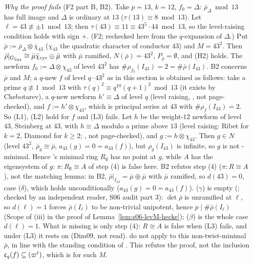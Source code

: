 \begin{remark}\label{rem:s06-levM-open}
\emph{Why the proof fails} (F2 part B, B2). Take $p=13$, $k=12$, $f_0=\Delta$: $\bar\rho_\Delta\bmod13$ has full image and $\Delta$ is ordinary at
$13$ ($\tau(13)\equiv8\bmod13$). Let $\ell=43\not\equiv\pm1\bmod13$; then $\tau(43)\equiv11\equiv43^5\cdot44\bmod13$, so the level-raising
condition holds with sign $+$. \stcomp{} (F2; rechecked here from the $q$-expansion of $\Delta$.) Put $\bar\rho:=\bar\rho_\Delta\otimes\bar\chi_{43}$
($\chi_{43}$ the quadratic character of conductor $43$) and $M=43^2$. Then $\bar\rho|_{G_{\mathbb{Q}_{43}}}\cong\bar\mu\bar\chi_{\rm cyc}\oplus\bar\mu$ with $\bar\mu$
ramified, $N(\bar\rho)=43^2$, $P_{\bar\rho}=\emptyset$, and (H2) holds. The newform $f_0:=\Delta\otimes\chi_{43}$ of level $43^2$ has $\#\rho_{f_0}(I_{43})=2=
\#\bar\rho(I_{43})$. B2 concerns $\bar\rho$ and $M$; a $q$-new $f$ of level $q\cdot43^2$ as in this section is obtained as follows: take a
prime $q\not\equiv1\bmod13$ with $\tau(q)^2\equiv q^{10}(q+1)^2\bmod13$ (it exists by Chebotarev), a $q$-new newform $h'\equiv\Delta$ of level
$q$ (level raising, \stcited, not page-checked), and $f:=h'\otimes\chi_{43}$, which is principal series at $43$ with $\#\rho_f(I_{43})=2$. So
(L1), (L2) hold for $f$ and (L3) fails. Let $h$ be the weight-$12$ newform of level $43$, Steinberg at $43$, with
$h\equiv\Delta$ modulo a prime above $13$ (level raising: Ribet for $k=2$, Diamond for $k\ge2$; \stcited, not page-checked), and
$g:=h\otimes\chi_{43}$. Then $g\in\mathcal N$ (level $43^2$, $\bar\rho_g\cong\bar\rho$, $a_{43}(g)=0=a_{43}(f)$), but $\rho_g(I_{43})$ is infinite, so $g$ is
not \cite{KO}-minimal. Hence \cite{KO}'s minimal ring $R_\emptyset$ has no point at $g$, while $A$ has the eigensystem of $g$: $\pi:R_\emptyset\cong A$
of step (4) is false here. B2 refutes step (4) ($\pi:R\cong A$), not the matching lemma: in B2,
$\bar\rho|_{I_{43}}=\bar\mu\oplus\bar\mu$ with $\bar\mu$ ramified, so $d(43)=0$, case ($\delta$), which holds unconditionally
($a_{43}(g)=0=a_{43}(f)$). ($\gamma$) is empty (\stproved; checked by an independent reader, S06 audit part 3): $\det\bar\rho$ is unramified at $\ell$, so $d(\ell)=1$ forces $\bar\rho(I_\ell)$ to be non-trivial unipotent, hence $p\mid\#\bar\rho(I_\ell)$ (Scope of (iii) in the proof of Lemma~\ref{lem:s06-levM-hecke}); ($\beta$) is the whole case $d(\ell)=1$. What is
missing is only step (4): $R\cong A$ is false when (L3) fails, and under (L3) it rests on \cite[Lemma~2.4]{KO} (Dim09, not read). \cite[Thm~2.9,
Lemma~2.4]{KO} do not apply to this non-twist-minimal $\bar\rho$, in line with the standing condition of \cite[\S3.1, p.~715]{DFG}. This refutes
the proof, not the inclusion $\mathfrak{c}_q(f)\subseteq(\varpi^t)$, which is \stopen{} for such $M$.


\end{remark}
